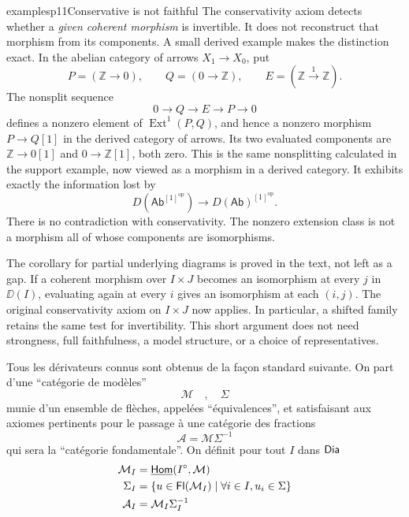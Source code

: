 \begin{dcomment}{examples}{p11}{Conservative is not faithful}
The conservativity axiom detects whether a \emph{given coherent morphism} is invertible. It does not reconstruct that morphism from its components. A small derived example makes the distinction exact. In the abelian category of arrows $X_1\to X_0$, put
\[
 P=(\mathbb Z\to0),\qquad Q=(0\to\mathbb Z),\qquad
 E=(\mathbb Z\xrightarrow{1}\mathbb Z).
\]
The nonsplit sequence
\[
 0\longrightarrow Q\longrightarrow E\longrightarrow P\longrightarrow0
\]
defines a nonzero element of $\operatorname{Ext}^1(P,Q)$, and hence a nonzero morphism $P\to Q[1]$ in the derived category of arrows. Its two evaluated components are $\mathbb Z\to0[1]$ and $0\to\mathbb Z[1]$, both zero. This is the same nonsplitting calculated in the support example, now viewed as a morphism in a derived category. It exhibits exactly the information lost by
\[
 D(\mathsf{Ab}^{[1]^{\mathrm{op}}})
 \longrightarrow D(\mathsf{Ab})^{[1]^{\mathrm{op}}}.
\]
There is no contradiction with conservativity. The nonzero extension class is not a morphism all of whose components are isomorphisms.

The corollary for partial underlying diagrams is proved in the text, not left as a gap. If a coherent morphism over $I\times J$ becomes an isomorphism at every $j$ in $\DD(I)$, evaluating again at every $i$ gives an isomorphism at each $(i,j)$. The original conservativity axiom on $I\times J$ now applies. In particular, a shifted family retains the same test for invertibility. This short argument does not need strongness, full faithfulness, a model structure, or a choice of representatives.
\end{dcomment}


Tous les dérivateurs connus sont obtenus de la façon standard suivante. On part d’une “catégorie de modèles”
\[
\mathcal{M} \quad , \quad \Sigma
\]
munie d’un ensemble de flèches, appelées “équivalences”, et satisfaisant aux axiomes pertinents pour le passage à une catégorie des fractions
\[
\mathcal{A} = \mathcal{M}\Sigma^{-1}
\]
qui sera la “catégorie fondamentale”. On définit pour tout $I$ dans $\mathsf{Dia}$
\[
\begin{aligned}
\mathcal{M}_I &= \underline{\mathsf{Hom}}(I^\circ,\mathcal{M}) \\
\Sigma_I &= \{u \in \mathsf{Fl}(\mathcal{M}_I) \mid \forall i \in I, u_i \in \Sigma\} \\
\mathcal{A}_I &= \mathcal{M}_I\Sigma_I^{-1}
\end{aligned}
\]

